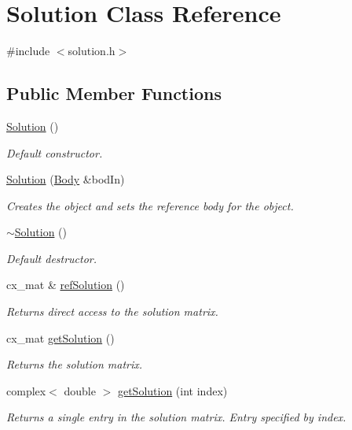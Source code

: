 \hypertarget{class_solution}{\section{Solution Class Reference}
\label{class_solution}
}


{\ttfamily \#include $<$solution.\-h$>$}

\subsection*{Public Member Functions}
\begin{DoxyCompactItemize}
\item 
\hyperlink{class_solution_ab55bd4b023d596ce11aaf737b9a6123b}{Solution} ()
\begin{DoxyCompactList}\small\item\em Default constructor. \end{DoxyCompactList}\item 
\hyperlink{class_solution_af1d658086ba6b4b0b78ffd985e85f06c}{Solution} (\hyperlink{class_body}{Body} \&bod\-In)
\begin{DoxyCompactList}\small\item\em Creates the object and sets the reference body for the object. \end{DoxyCompactList}\item 
\hyperlink{class_solution_a5d245f7409aacf6ace5e965b7879a580}{$\sim$\-Solution} ()
\begin{DoxyCompactList}\small\item\em Default destructor. \end{DoxyCompactList}\item 
cx\-\_\-mat \& \hyperlink{class_solution_aa224465c8237cd395681164bee0d7f8d}{ref\-Solution} ()
\begin{DoxyCompactList}\small\item\em Returns direct access to the solution matrix. \end{DoxyCompactList}\item 
cx\-\_\-mat \hyperlink{class_solution_a631b5866d3df132464a7d1ec70cc6028}{get\-Solution} ()
\begin{DoxyCompactList}\small\item\em Returns the solution matrix. \end{DoxyCompactList}\item 
complex$<$ double $>$ \hyperlink{class_solution_abf5f82f209b6a3295b89ef3a6fad293d}{get\-Solution} (int index)
\begin{DoxyCompactList}\small\item\em Returns a single entry in the solution matrix. Entry specified by index. \end{DoxyCompactList}\item 

\end{DoxyCompactItemize}
